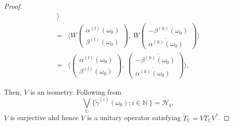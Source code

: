 \documentclass[pdflatex,sn-mathphys-num]{sn-jnl}%
\theoremstyle{thmstyleone}%
\theoremstyle{thmstyletwo}%
\theoremstyle{thmstylethree}%
\theoremstyle{definition}
\theoremstyle{remark}
\begin{document}
\begin{proof}
\begin{equation*}
\begin{aligned}
		\rangle \\
		= & \langle
		W\begin{pmatrix}
			\alpha^{(l)}(\omega_0) \\
			\beta^{(l)}(\omega_0)
		\end{pmatrix},\
		W\begin{pmatrix}
			-\overline{\beta^{(k)}(\omega_0)} \\
			\overline{\alpha^{(k)}(\omega_0)}
		\end{pmatrix}
		\rangle \\
		= & \langle
		\begin{pmatrix}
			\alpha^{(l)}(\omega_0) \\
			\beta^{(l)}(\omega_0)
		\end{pmatrix},\
		\begin{pmatrix}
			-\overline{\beta^{(k)}(\omega_0)} \\
			\overline{\alpha^{(k)}(\omega_0)}
		\end{pmatrix}
		\rangle,
	\end{aligned}
\end{equation*}

   Then, $V$ is an isometry. Following from
   \[
   {\bigvee}_{\mathbb{C}}\{\widetilde{\gamma}^{(i)}(\omega_0); i\in\mathbb{N}\ \}=\mathcal{H}_q,
   \]
   $V$ is surjective ahd hence $V$ is a unitary operator satisfying $\widetilde{T}_{\mathbb{C}}=VT_{\mathbb{C}}V^*$.


\end{proof}
\end{document}
